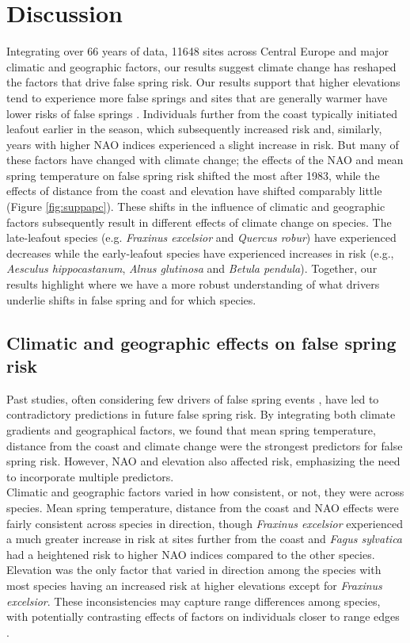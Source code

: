 \documentclass{article}\usepackage[]{graphicx}\usepackage[]{color}
\begin{document}
\section*{Discussion} %
Integrating over 66 years of data, 11648 sites across Central Europe and major climatic and geographic factors, our results suggest climate change has reshaped the factors that drive false spring risk. Our results support that higher elevations tend to experience more false springs \citep{Vitra2017,Vitasse2018} and sites that are generally warmer have lower risks of false springs \citep{Wypych2016}. Individuals further from the coast typically initiated leafout earlier in the season, which subsequently increased risk and, similarly, years with higher NAO indices experienced a slight increase in risk. But many of these factors have changed with climate change; the effects of the NAO and mean spring temperature on false spring risk shifted the most after 1983, while the effects of distance from the coast and elevation have shifted comparably little (Figure \ref{fig:suppapc}). These shifts in the influence of climatic and geographic factors subsequently result in different effects of climate change on species. The late-leafout species (e.g. \textit{Fraxinus excelsior} and \textit{Quercus robur}) have experienced decreases while the early-leafout species have experienced increases in risk (e.g., \textit{Aesculus hippocastanum}, \textit{Alnus glutinosa} and \textit{Betula pendula}).  Together, our results highlight where we have a more robust understanding of what drivers underlie shifts in false spring and for which species. 

\subsection*{Climatic and geographic effects on false spring risk}
Past studies, often considering few drivers of false spring events \citep{Wypych2016a,Liu2018, Ma2018, Vitasse2018}, have led to contradictory predictions in future false spring risk. By integrating both climate gradients and geographical factors, we found that mean spring temperature, distance from the coast and climate change were the strongest predictors for false spring risk. However, NAO and elevation also affected risk, emphasizing the need to incorporate multiple predictors. \\

Climatic and geographic factors varied in how consistent, or not, they were across species. Mean spring temperature, distance from the coast and NAO effects were fairly consistent across species in direction, though \textit{Fraxinus excelsior} experienced a much greater increase in risk at sites further from the coast and \textit{Fagus sylvatica} had a heightened risk to higher NAO indices compared to the other species. Elevation was the only factor that varied in direction among the species with most species having an increased risk at higher elevations except for \textit{Fraxinus excelsior}. These inconsistencies may capture range differences among species, with potentially contrasting effects of factors on individuals closer to range edges \citep{Chuine2008}. 
\end{document}
